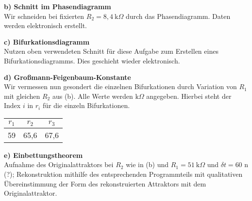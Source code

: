 \textbf{b) Schnitt im Phasendiagramm}\\
Wir schneiden bei fixierten $R_2=8,4~\text{k}\Omega$ durch das Phasendiagramm.
Daten werden elektronisch erstellt.

\textbf{c) Bifurkationsdiagramm}\\
Nutzen oben verwendeten Schnitt für diese Aufgabe zum Erstellen eines Bifurkationsdiagramms. Dies geschieht wieder elektronisch.

\textbf{d) Großmann-Feigenbaum-Konstante}\\
Wir vermessen nun gesondert die einzelnen Bifurkationen durch Variation von $R_1$ mit gleichen $R_2$ aus (b). Alle Werte werden $\text{k}\Omega$ angegeben. Hierbei steht der Index $i$ in $r_i$ für die einzeln Bifurkationen.\\
\begin{tabular}{c c c}
    $r_1$ & $r_2$ & $r_3$\\
    \hline
    59 & 65,6 & 67,6
\end{tabular}

\textbf{e) Einbettungstheorem}\\
Aufnahme des Originalattraktors bei $R_2$ wie in (b) und $R_1=51~\text{k}\Omega$ und $\delta t=60$ n (?); Rekonstruktion mithilfe des entsprechenden Programmteils mit qualitativen Übereinstimmung der Form des rekonstruierten Attraktors mit dem Originalattraktor.


%
%
